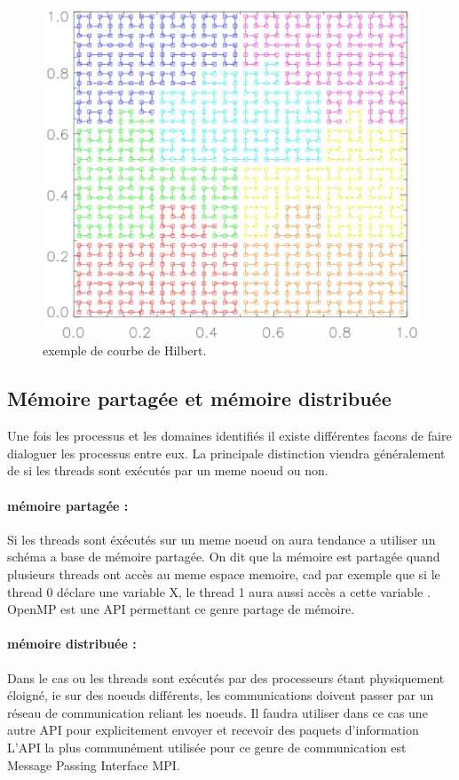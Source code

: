 \begin{figure}[bth]
        \includegraphics[width=.95\linewidth]{img/02/hilbert2.png} 
        \caption{exemple de courbe de Hilbert. 
}
 		\label{fig:hilbert2}
\end{figure}


\subsection{Mémoire partagée et mémoire distribuée}

Une fois les processus et les domaines identifiés il existe différentes facons de faire dialoguer les processus entre eux.
La principale distinction viendra généralement de si les threads sont exécutés par un meme noeud ou non.

\paragraph{mémoire partagée : } 
Si les threads sont éxécutés sur un meme noeud on aura tendance a utiliser un schéma a base de mémoire partagée.
On dit que la mémoire est partagée quand plusieurs threads ont accès au meme espace memoire, cad par exemple que si le thread 0 déclare une variable X, le thread 1 aura aussi accès a cette variable . 
OpenMP est une API permettant ce  genre partage de mémoire.

\paragraph{mémoire distribuée : } 
Dans le cas ou les threads sont exécutés par des processeurs étant physiquement éloigné, ie sur des noeuds différents, les communications doivent passer par un réseau de communication reliant les noeuds.
Il faudra utiliser dans ce cas une autre API pour explicitement envoyer et recevoir des paquets d'information
L'API la plus communément utilisée pour ce genre de communication est Message Passing Interface MPI.


